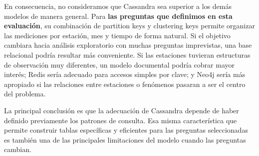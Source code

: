En consecuencia, no consideramos que Cassandra sea superior a los demás modelos de manera general. Para \textbf{las preguntas que definimos en esta evaluación}, su combinación de partition keys y clustering keys permite organizar las mediciones por estación, mes y tiempo de forma natural. Si el objetivo cambiara hacia análisis exploratorio con muchas preguntas imprevistas, una base relacional podría resultar más conveniente. Si las estaciones tuvieran estructuras de observación muy diferentes, un modelo documental podría cobrar mayor interés; Redis sería adecuado para accesos simples por clave; y Neo4j sería más apropiado si las relaciones entre estaciones o fenómenos pasaran a ser el centro del problema.

La principal conclusión es que la adecuación de Cassandra depende de haber definido previamente los patrones de consulta. Esa misma característica que permite construir tablas específicas y eficientes para las preguntas seleccionadas es también una de las principales limitaciones del modelo cuando las preguntas cambian.
